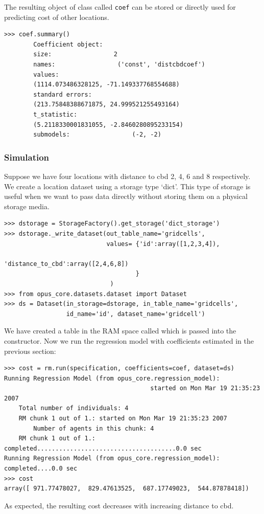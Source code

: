 The resulting object of class  \coefficientsindex called \verb|coef| can be stored or
directly used for predicting cost of other locations.
\coefficientsindex
\begin{verbatim}
>>> coef.summary()
        Coefficient object:
        size:                 2
        names:                 ('const', 'distcbdcoef')
        values:
        (1114.073486328125, -71.149337768554688)
        standard errors:
        (213.75848388671875, 24.999521255493164)
        t_statistic:
        (5.2118330001831055, -2.8460280895233154)
        submodels:                 (-2, -2)
\end{verbatim}

%
\subsubsection{Simulation}
%
Suppose we have four locations with distance to cbd 2, 4, 6 and 8
respectively. We create a location dataset \datasetindex using
a storage type `dict'.
This type of storage is useful when we want to pass data directly without storing them on a physical storage media.


\begin{verbatim}
>>> dstorage = StorageFactory().get_storage('dict_storage')
>>> dstorage._write_dataset(out_table_name='gridcells',
                            values= {'id':array([1,2,3,4]),
                                     'distance_to_cbd':array([2,4,6,8])
                                    }
                             )
>>> from opus_core.datasets.dataset import Dataset
>>> ds = Dataset(in_storage=dstorage, in_table_name='gridcells',
                 id_name='id', dataset_name='gridcell')
\end{verbatim}
We have created a table in the RAM space called  which is passed into the  constructor.
Now we run the regression model with coefficients \coefficientsindex estimated in the previous
section:
\coefficientsindex \datasetindex
\begin{verbatim}
>>> cost = rm.run(specification, coefficients=coef, dataset=ds)
Running Regression Model (from opus_core.regression_model):
                                        started on Mon Mar 19 21:35:23 2007
    Total number of individuals: 4
    RM chunk 1 out of 1.: started on Mon Mar 19 21:35:23 2007
        Number of agents in this chunk: 4
    RM chunk 1 out of 1.: completed......................................0.0 sec
Running Regression Model (from opus_core.regression_model): completed....0.0 sec
>>> cost
array([ 971.77478027,  829.47613525,  687.17749023,  544.87878418])
\end{verbatim}
As expected, the resulting cost decreases with increasing distance to cbd.

